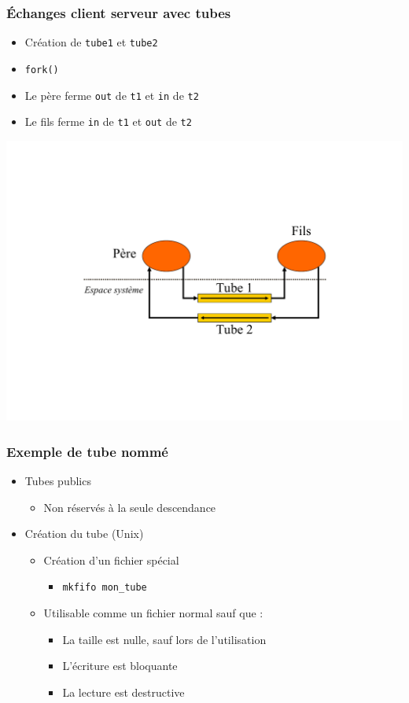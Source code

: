 \begin{frame}
\frametitle{Échanges client serveur avec tubes}
\begin{itemize}
\item Création de \texttt{tube1} et \texttt{tube2}
\item \texttt{fork()}
\item Le père ferme \texttt{out} de \texttt{t1} et \texttt{in} de \texttt{t2}
\item Le fils ferme \texttt{in} de \texttt{t1} et \texttt{out} de \texttt{t2}
\end{itemize}
\includegraphics[width=.9\textwidth]{../illustration/tube_cs.pdf}
\end{frame}

\begin{frame}
\frametitle{Exemple de tube nommé}
\begin{itemize}
\item Tubes publics
\begin{itemize}
\item Non réservés à la seule descendance
\end{itemize}
\item Création du tube (Unix)
\begin{itemize}
\item Création d’un fichier spécial
\begin{itemize}
\item \texttt{mkfifo mon\_tube}
\end{itemize}
\item Utilisable comme un fichier normal sauf que :
\begin{itemize}
\item La taille est nulle, sauf lors de l’utilisation
\item L’écriture est bloquante
\item La lecture est destructive
\end{itemize}
\end{itemize}
\end{itemize}
\end{frame}


